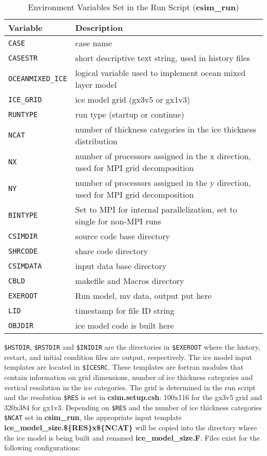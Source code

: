 \begin{table}
  \begin{center}
  \caption{Environment Variables Set in the Run Script ({\bf csim\_run})}
  \label{table:main_environ_var}
  \begin{tabular}{p{3.5cm}p{9cm}} \hline

  Variable    & Description    \\ \hline \hline
   {\tt CASE}     & case name   \\
   {\tt CASESTR}  & short descriptive text string, used in history files  \\
   {\tt OCEANMIXED\_ICE}  & logical variable used to implement ocean mixed layer model \\
   {\tt ICE\_GRID}& ice model grid (gx3v5 or gx1v3)            \\
   {\tt RUNTYPE}  & run type (startup or continue)\\
   {\tt NCAT}     & number of thickness categories in the ice thickness distribution \\
   {\tt NX}       & number of processors assigned in the x direction,
              used for MPI grid decomposition  \\
   {\tt NY}       & number of processors assigned in the y direction,
              used for MPI grid decomposition  \\
   {\tt BINTYPE}  & Set to MPI for internal parallelization, set to single for non-MPI runs  \\
   {\tt CSIMDIR}  & source code base directory  \\
   {\tt SHRCODE}  & share code directory  \\
   {\tt CSIMDATA} & input data base directory   \\
   {\tt CBLD}     & makefile and Macros directory  \\
   {\tt EXEROOT}  & Run model, mv data, output put here  \\
   {\tt LID}      & timestamp for file ID string  \\
   {\tt OBJDIR}  & ice model code is built here  \\
  \hline
  \end{tabular}
  \end{center}
\end{table}

{\tt \$HSTDIR}, {\tt \$RSTDIR} and {\tt \$INIDIR} are the directories in
{\tt \$EXEROOT} where the history, restart, and initial condition
files are output, respectively.  The ice model input templates are
located in {\tt \$ICESRC}. These templates are fortran modules that contain
information on grid dimensions, number of ice thickness categories and
vertical resolution in the ice categories. The grid is determined in
the run script and the resolution {\tt \$RES} is set in {\bf csim.setup.csh}:
100x116 for the gx3v5 grid and 320x384 for gx1v3.  Depending on {\tt \$RES} and the
number of ice thickness categories {\tt \$NCAT} set in {\bf csim\_run}, the
appropriate input template {\bf ice\_model\_size.\$\{RES\}x\$\{NCAT\}} will
be copied into the directory where the ice model is being built and renamed
{\bf ice\_model\_size.F}.  Files exist for the following configurations:\\

